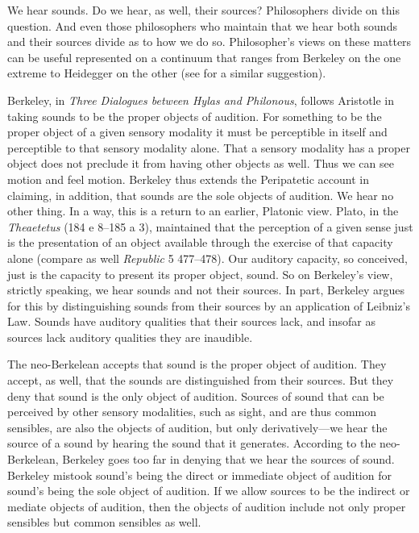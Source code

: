 We hear sounds. Do we hear, as well, their sources? Philosophers divide on this question. And even those philosophers who maintain that we hear both sounds and their sources divide as to how we do so. Philosopher's views on these matters can be useful represented on a continuum that ranges from Berkeley on the one extreme to Heidegger on the other (see \citealt{Leddington:2014aa} for a similar suggestion). 

\nocite{Berkeley:1734fk} Berkeley, in \emph{Three Dialogues between Hylas and Philonous}, follows Aristotle in taking sounds to be the proper objects of audition. For something to be the proper object of a given sensory modality it must be perceptible in itself and perceptible to that sensory modality alone. That a sensory modality has a proper object does not preclude it from having other objects as well. Thus we can see motion and feel motion. Berkeley thus extends the Peripatetic account in claiming, in addition, that sounds are the sole objects of audition. We hear no other thing. In a way, this is a return to an earlier, Platonic view. Plato, in the \emph{Theaetetus} (184 e 8--185 a 3), maintained that the perception of a given sense just is the presentation of an object available through the exercise of that capacity alone (compare as well \emph{Republic} 5 477--478). Our auditory capacity, so conceived, just is the capacity to present its proper object, sound. So on Berkeley's view, strictly speaking, we hear sounds and not their sources. In part, Berkeley argues for this by distinguishing sounds from their sources by an application of Leibniz's Law. Sounds have auditory qualities that their sources lack, and insofar as sources lack auditory qualities they are inaudible. 

The neo-Berkelean accepts that sound is the proper object of audition. They accept, as well, that the sounds are distinguished from their sources. But they deny that sound is the only object of audition. Sources of sound that can be perceived by other sensory modalities, such as sight, and are thus common sensibles, are also the objects of audition, but only derivatively---we hear the source of a sound by hearing the sound that it generates. According to the neo-Berkelean, Berkeley goes too far in denying that we hear the sources of sound. Berkeley mistook sound's being the direct or immediate object of audition for sound's being the sole object of audition. If we allow sources to be the indirect or mediate objects of audition, then the objects of audition include not only proper sensibles but common sensibles as well.

